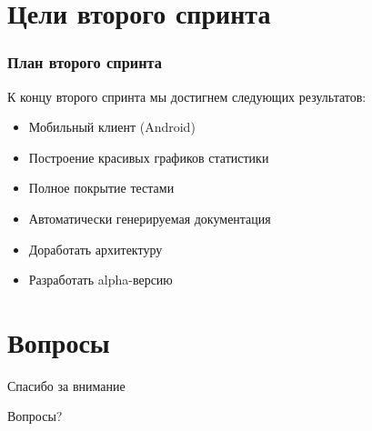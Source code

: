 \documentclass{beamer}
\newlength{\wideitemsep}
\let\olditem\item
\renewcommand{\item}{\setlength{\itemsep}{\wideitemsep}\olditem}
\begin{document}
\section{Цели второго спринта}

\begin{frame}
\frametitle{План второго спринта}

К концу второго спринта мы достигнем следующих результатов:
\medskip
\begin{itemize}
\item Мобильный клиент (Android)
\item Построение красивых графиков статистики
\item Полное покрытие тестами
\item Автоматически генерируемая документация
\item Доработать архитектуру
\item Разработать alpha-версию
\end{itemize}

\end{frame}

\section{Вопросы}

\begin{frame}
\Huge{\centerline{Спасибо за внимание}}
\Huge{\centerline{Вопросы?}}
\end{frame}

\end{document}
